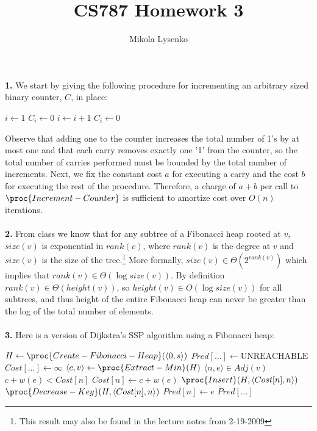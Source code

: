 \documentclass{article}
\title{CS787 Homework 3}
\author{Mikola Lysenko}
\begin{document}
\maketitle{}

\paragraph{} \textbf{1.}
We start by giving the following procedure for incrementing an arbitrary sized binary counter, $C$, in place:

\begin{codebox}
\li $i \gets 1$
\li {}
\li		\Do $C_i \gets 0$
\li			$i \gets i + 1$
		\End
\li $C_i \gets 0$
\end{codebox}

Observe that adding one to the counter increases the total number of 1's by at most one and that each carry removes exactly one '1' from the counter, so the total number of carries performed must be bounded by the total number of increments.  Next, we fix the constant cost $a$ for executing a carry and the cost $b$ for executing the rest of the procedure.  Therefore, a charge of $a + b$ per call to $\proc{Increment-Counter}$ is sufficient to amortize cost over $O(n)$ iterations.

\paragraph{} \textbf{2.}
From class we know that for any subtree of a Fibonacci heap rooted at $v$, $size(v)$ is exponential in $rank(v)$, where $rank(v)$ is the degree at $v$ and $size(v)$ is the size of the tree.\footnote{This result may also be found in the lecture notes from 2-19-2009}  More formally, $size(v) \in \Theta(2^{rank(v)})$ which implies that $rank(v) \in \Theta(\log{size(v)})$.  By definition $rank(v) \in \Theta(height(v))$, so $height(v) \in O(\log{size(v)})$ for all subtrees, and thus height of the entire Fibonacci heap can never be greater than the log of the total number of elements.

\paragraph{} \textbf{3.}
Here is a version of Dijkstra's SSP algorithm using a Fibonacci heap:

\begin{codebox}
\li $H \gets \proc{Create-Fibonacci-Heap}( \langle 0, s \rangle )$
\li $Pred[...] \gets \textrm{UNREACHABLE}$
\li $Cost[...] \gets \infty$
\li {}
\li		\Do	$\langle c, v \rangle \gets \proc{Extract-Min}(H)$
\li		\For {} $\langle n, e \rangle \in Adj(v)$  $c + w(e) < Cost[n]$
\li			\Do $Cost[n] \gets c + w(e)$
\li				{} 
\li					\Then $\proc{Insert}(H, \langle Cost[n], n \rangle)$
\li				\Else	$\proc{Decrease-Key}(H, \langle Cost[n], n \rangle)$
				\End
\li				$Pred[n] \gets e$
			\End
		\End
\li \Return $Pred[...]$
\end{codebox}
\end{document}
